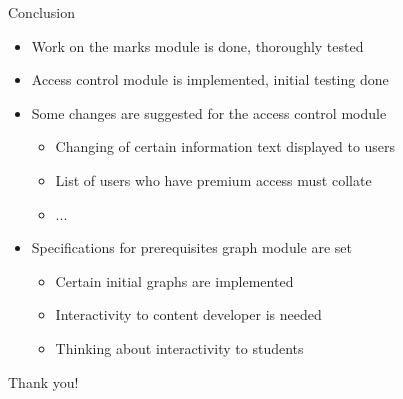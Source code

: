 \documentclass{beamer}
\begin{document}
\begin{frame}{Conclusion}
	\begin{itemize}
		\item Work on the marks module is done, thoroughly tested
		\item Access control module is implemented, initial testing done
		\item Some changes are suggested for the access control module
		\begin{itemize}
			\item Changing of certain information text displayed to users
			\item List of users who have premium access must collate
			\item ...
		\end{itemize}
		\item Specifications for prerequisites graph module are set
		\begin{itemize}
			\item Certain initial graphs are implemented
			\item Interactivity to content developer is needed
			\item Thinking about interactivity to students
		\end{itemize}
	\end{itemize}
\end{frame}

\begin{frame}
	\centering
	\huge
	Thank you!
\end{frame}
\end{document}
